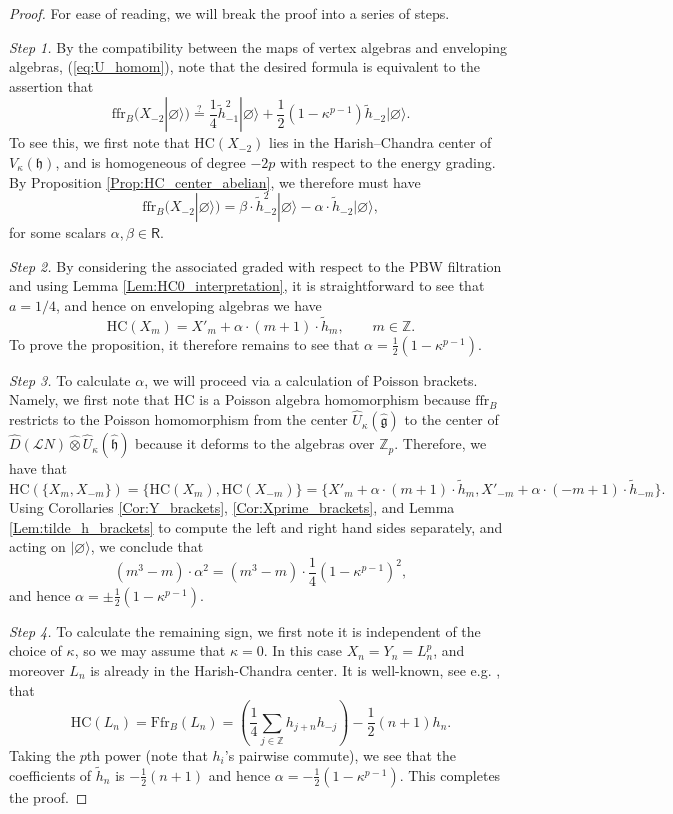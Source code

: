 \documentclass{amsart}
\theoremstyle{definition}
\newcommand{\fh}{\mathfrak{h}}
\newcommand{\Ring}{\mathsf{R}}
\newcommand{\hg}{\hat{\mathfrak{g}}}
\newcommand{\hh}{\hat{\mathfrak{h}}}
\newcommand{\ffr}{\mathrm{ffr}}
\newcommand{\HC}{\mathrm{HC}} %
\newcommand{\Z}{\mathbb{Z}}
\newcommand{\Loop}{\mathscr{L}}
\newcommand{\Ffr}{\mathrm{{Ffr}}}
\numberwithin{equation}{section}
\begin{document}
\begin{proof}For ease of reading, we will break the proof into a series of steps. 

{\it Step 1.} By the compatibility between the maps of vertex algebras and enveloping algebras, (\ref{eq:U_homom}), note that the desired formula is equivalent to the assertion that 
$$\ffr_B(X_{-2} | \varnothing \rangle) \overset{?}= \frac{1}{4} \tilde{h}_{-1}^2 | \varnothing \rangle + \frac{1}{2}(1 - \kappa^{p-1}) \tilde{h}_{-2} | \varnothing \rangle. $$
To see this, we first note that $\HC(X_{-2})$ lies in the Harish--Chandra center of $V_{\kappa}(\fh)$, and is homogeneous of degree $-2p$ with respect to the energy grading. By Proposition \ref{Prop:HC_center_abelian}, we therefore must have 
$$\ffr_B(X_{-2} | \varnothing \rangle) = \beta \cdot \tilde{h}_{-2}^2 | \varnothing \rangle - \alpha \cdot \tilde{h}_{-2} | \varnothing \rangle,$$
for some scalars $\alpha,\beta\in \Ring.$

{\it Step 2.} By considering the associated graded with respect to the PBW filtration and using Lemma \ref{Lem:HC0_interpretation}, it is straightforward to see that $a = 1/4$, and hence on enveloping algebras we have 
$$\HC(X_{m}) = X'_m + \alpha \cdot (m+1) \cdot  \tilde{h}_m, \quad \quad m \in \mathbb{Z}. $$
To prove the proposition, it therefore remains to see that $\alpha = \frac{1}{2}(1 - \kappa^{p-1}).$ 

{\it Step 3.} To calculate $\alpha$, we will proceed via a calculation of Poisson brackets. Namely, we first note that $\HC$ is a Poisson algebra homomorphism because $\ffr_B$ restricts to the Poisson homomorphism from the center $\widehat{U}_\kappa(\hg)$ to the center of 
$\widehat{D}(\Loop N)\widehat{\otimes} \widehat{U}_\kappa(\hh)$ because it deforms to the algebras over $\Z_p$. Therefore, we have that 
$$\HC(\{ X_m, X_{-m} \} ) = \{ \HC(X_m), \HC(X_{-m}) \}  =  \{ X'_m + \alpha \cdot (m+1) \cdot \tilde{h}_m, X'_{-m} + \alpha \cdot (-m + 1) \cdot \tilde{h}_{-m} \}.$$
Using Corollaries \ref{Cor:Y_brackets}, 
\ref{Cor:Xprime_brackets}, and Lemma 
\ref{Lem:tilde_h_brackets} to compute the left and right hand sides separately, and acting on $| \varnothing \rangle$, we conclude that $$(m^3 - m) \cdot \alpha^2 =(m^3-m) \cdot \frac{1}{4}(1-\kappa^{p-1})^2,$$ 
and hence $\alpha = \pm \frac{1}{2} (1 - \kappa^{p-1}).$

{\it Step 4.} To calculate the remaining sign, we first note it is independent of the choice of $\kappa$, so we may assume that $\kappa=0$. In this case $X_n=Y_n=L_n^p$, and moreover $L_n$ is already in the Harish-Chandra center. It is well-known, see e.g. \cite[Proposition 6.2.2]{Frenkel_loop}, that 
$$\HC(L_n)=\Ffr_B(L_n)=\left(\frac{1}{4}\sum_{j\in \Z}h_{j+n}h_{-j}\right)-\frac{1}{2}(n+1) h_{n}.$$
Taking the $p$th power (note that $h_{i}$'s pairwise commute), we see that the coefficients of $\tilde{h}_n$ is $-\frac{1}{2}(n+1)$ and hence $\alpha=-\frac{1}{2}(1-\kappa^{p-1})$. This completes the proof.
\end{proof}
\end{document}
